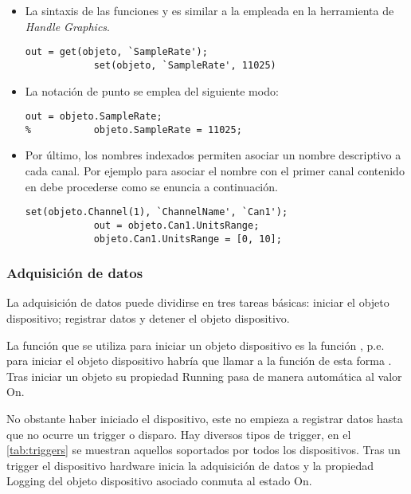 \begin{itemize}
	\item La sintaxis de las funciones  y  es
		similar a la empleada en la herramienta de \matlab{}
		\emph{Handle Graphics}.

		\begin{lstlisting}[gobble=16]
			out = get(objeto, `SampleRate');
			set(objeto, `SampleRate', 11025)
		\end{lstlisting}

	\item La notación de punto se emplea del siguiente modo:

		\begin{lstlisting}[gobble=16]
			out = objeto.SampleRate;
% 			objeto.SampleRate = 11025;
		\end{lstlisting}

	\item Por último, los nombres indexados permiten asociar un nombre
		descriptivo a cada canal. Por ejemplo para asociar el
		nombre  con el primer canal contenido en
		 debe procederse como se enuncia a
		continuación.

		\begin{lstlisting}[gobble=16]
			set(objeto.Channel(1), `ChannelName', `Can1');
			out = objeto.Can1.UnitsRange;
			objeto.Can1.UnitsRange = [0, 10];
		\end{lstlisting}

\end{itemize}


\subsubsection{Adquisición de datos}

La adquisición de datos puede dividirse en tres tareas básicas: iniciar el
objeto dispositivo; registrar datos y detener el objeto dispositivo.

La función que se utiliza para iniciar un objeto dispositivo es la función
, p.e. para iniciar el objeto dispositivo  habría
que llamar a la función de esta forma . Tras iniciar un
objeto su propiedad \textsf{Running} pasa de manera automática al valor
\textsf{On}.

No obstante haber iniciado el dispositivo, este no empieza a registrar
datos hasta que no ocurre un trigger o disparo. Hay diversos tipos de
trigger, en el \vref{tab:triggers} se muestran aquellos soportados por
todos los dispositivos. Tras un trigger el dispositivo hardware inicia la
adquisición de datos y la propiedad \textsf{Logging} del objeto dispositivo
asociado conmuta al estado \textsf{On}.

